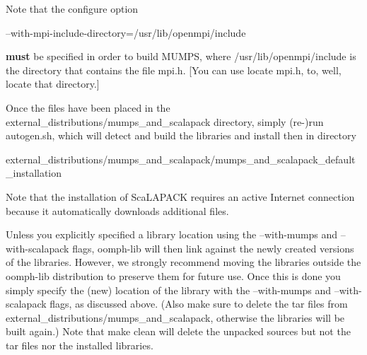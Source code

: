 Note that the configure option 
\begin{DoxyCode}
--with-mpi-include-directory=/usr/lib/openmpi/include
\end{DoxyCode}
 {\bfseries  must } be specified in order to build {\ttfamily M\+U\+M\+PS}, where {\ttfamily /usr/lib/openmpi/include} is the directory that contains the file {\ttfamily mpi.\+h}. \mbox{[}You can use {\ttfamily locate mpi.\+h}, to, well, locate that directory.\mbox{]}

Once the files have been placed in the {\ttfamily external\+\_\+distributions/mumps\+\_\+and\+\_\+scalapack} directory, simply (re-\/)run {\ttfamily autogen.\+sh}, which will detect and build the libraries and install then in directory 
\begin{DoxyCode}
external\_distributions/mumps\_and\_scalapack/mumps\_and\_scalapack\_default\_installation
\end{DoxyCode}


Note that the installation of {\ttfamily Sca\+L\+A\+P\+A\+CK} requires an active Internet connection because it automatically downloads additional files.

Unless you explicitly specified a library location using the {\ttfamily --with-\/mumps} and {\ttfamily --with-\/scalapack} flags, {\ttfamily oomph-\/lib} will then link against the newly created versions of the libraries. However, we strongly recommend moving the libraries outside the {\ttfamily oomph-\/lib} distribution to preserve them for future use. Once this is done you simply specify the (new) location of the library with the {\ttfamily --with-\/mumps} and {\ttfamily --with-\/scalapack} flags, as discussed above. (Also make sure to delete the tar files from {\ttfamily external\+\_\+distributions/mumps\+\_\+and\+\_\+scalapack}, otherwise the libraries will be built again.) Note that {\ttfamily make} {\ttfamily clean} will delete the unpacked sources but not the tar files nor the installed libraries.



